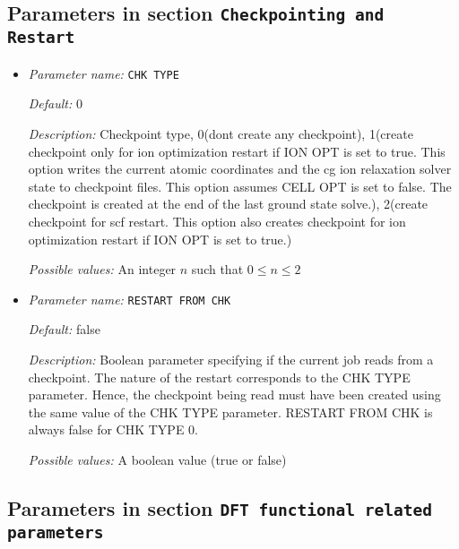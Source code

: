 \subsection{Parameters in section \tt Checkpointing and Restart}
\label{parameters:Checkpointing_20and_20Restart}

\begin{itemize}
\item {\it Parameter name:} {\tt CHK TYPE}
\label{parameters:Checkpointing and Restart/CHK TYPE}
\label{parameters:Checkpointing_20and_20Restart/CHK_20TYPE}


{\it Default:} 0


{\it Description:} Checkpoint type, 0(dont create any checkpoint), 1(create checkpoint only for ion optimization restart if ION OPT is set to true. This option writes the current atomic coordinates and the cg ion relaxation solver state to checkpoint files. This option assumes CELL OPT is set to false. The checkpoint is created at the end of the last ground state solve.), 2(create checkpoint for scf restart. This option also creates checkpoint for ion optimization restart if ION OPT is set to true.)


{\it Possible values:} An integer $n$ such that $0\leq n \leq 2$
\item {\it Parameter name:} {\tt RESTART FROM CHK}
\label{parameters:Checkpointing and Restart/RESTART FROM CHK}
\label{parameters:Checkpointing_20and_20Restart/RESTART_20FROM_20CHK}


{\it Default:} false


{\it Description:} Boolean parameter specifying if the current job reads from a checkpoint. The nature of the restart corresponds to the CHK TYPE parameter. Hence, the checkpoint being read must have been created using the same value of the CHK TYPE parameter. RESTART FROM CHK is always false for CHK TYPE 0.


{\it Possible values:} A boolean value (true or false)
\end{itemize}

\subsection{Parameters in section \tt DFT functional related parameters}
\label{parameters:DFT_20functional_20related_20parameters}

